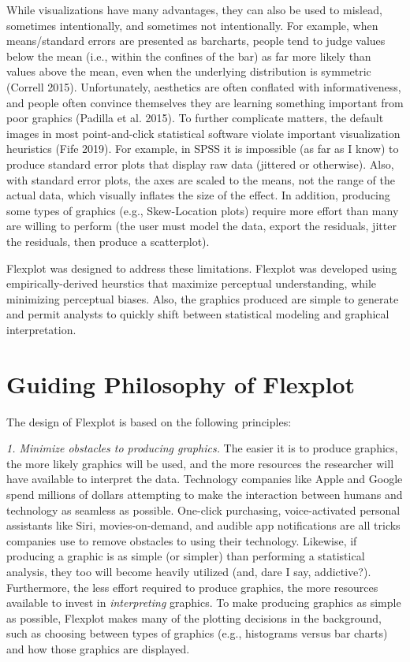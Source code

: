 \documentclass[,]{book}
\begin{document}
While visualizations have many advantages, they can also be used to
mislead, sometimes intentionally, and sometimes not intentionally. For
example, when means/standard errors are presented as barcharts, people
tend to judge values below the mean (i.e., within the confines of the
bar) as far more likely than values above the mean, even when the
underlying distribution is symmetric (Correll 2015). Unfortunately,
aesthetics are often conflated with informativeness, and people often
convince themselves they are learning something important from poor
graphics (Padilla et al. 2015). To further complicate matters, the
default images in most point-and-click statistical software violate
important visualization heuristics (Fife 2019). For example, in SPSS it
is impossible (as far as I know) to produce standard error plots that
display raw data (jittered or otherwise). Also, with standard error
plots, the axes are scaled to the means, not the range of the actual
data, which visually inflates the size of the effect. In addition,
producing some types of graphics (e.g., Skew-Location plots) require
more effort than many are willing to perform (the user must model the
data, export the residuals, jitter the residuals, then produce a
scatterplot).

Flexplot was designed to address these limitations. Flexplot was
developed using empirically-derived heurstics that maximize perceptual
understanding, while minimizing perceptual biases. Also, the graphics
produced are simple to generate and permit analysts to quickly shift
between statistical modeling and graphical interpretation.

\chapter*{Guiding Philosophy of
Flexplot}\label{guiding-philosophy-of-flexplot}

The design of Flexplot is based on the following principles:

\emph{1. Minimize obstacles to producing graphics.} The easier it is to
produce graphics, the more likely graphics will be used, and the more
resources the researcher will have available to interpret the data.
Technology companies like Apple and Google spend millions of dollars
attempting to make the interaction between humans and technology as
seamless as possible. One-click purchasing, voice-activated personal
assistants like Siri, movies-on-demand, and audible app notifications
are all tricks companies use to remove obstacles to using their
technology. Likewise, if producing a graphic is as simple (or simpler)
than performing a statistical analysis, they too will become heavily
utilized (and, dare I say, addictive?). Furthermore, the less effort
required to produce graphics, the more resources available to invest in
\emph{interpreting} graphics. To make producing graphics as simple as
possible, Flexplot makes many of the plotting decisions in the
background, such as choosing between types of graphics (e.g., histograms
versus bar charts) and how those graphics are displayed.
\end{document}
